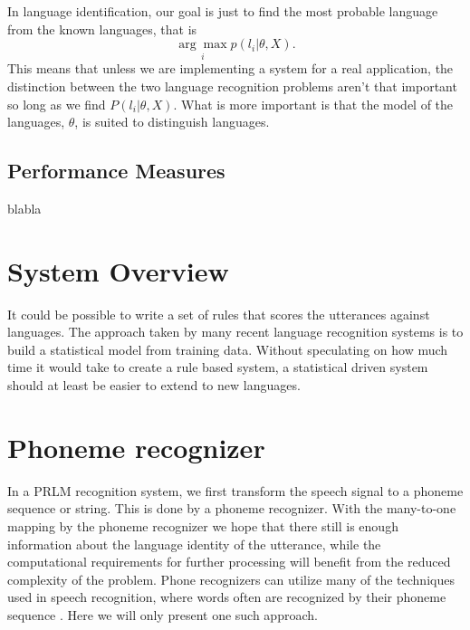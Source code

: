  In language identification, our goal is just to find the most probable language from the known languages, that is
\begin{equation*}
\underset{i}{\arg \max} p(l_i | \theta, X).
\end{equation*}
This means that unless we are implementing a system for a real application, the distinction between the two language recognition problems aren't that important so long as we find $P(l_i | \theta, X)$. What is more important is that the model of the languages, $\theta$, is suited to distinguish languages.

\subsection{Performance Measures}

blabla

\section{System Overview}
\label{sect:sysoverview}

It could be possible to write a set of rules that scores the utterances against languages. The approach taken by many recent language recognition systems is to build a statistical model from training data. Without speculating on how much time it would take to create a rule based system, a statistical driven system should at least be easier to extend to new languages.


\section{Phoneme recognizer}
\label{sect:phnrec}

In a PRLM recognition system, we first transform the speech signal to a phoneme sequence or string. This is done by a phoneme recognizer. With the many-to-one mapping by the phoneme recognizer we hope that there still is enough information about the language identity of the utterance, while the computational requirements for further processing will benefit from the reduced complexity of the problem. Phone recognizers can utilize many of the techniques used in speech recognition,  where words often are recognized by their phoneme sequence \cite[p. 414]{talegk}. Here we will only present one such approach.

